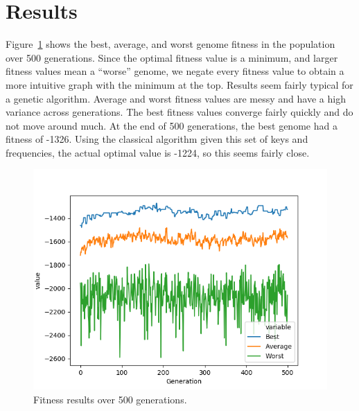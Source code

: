 
\section{Results}

Figure~\ref{fig:results} shows the best, average, and worst genome fitness in the population over 500 generations. Since the optimal fitness value is a minimum, and larger fitness values mean a ``worse'' genome, we negate every fitness value to obtain a more intuitive graph with the minimum at the top. Results seem fairly typical for a genetic algorithm. Average and worst fitness values are messy and have a high variance across generations. The best fitness values converge fairly quickly and do not move around much. At the end of 500 generations, the best genome had a fitness of -1326. Using the classical algorithm given this set of keys and frequencies, the actual optimal value is -1224, so this seems fairly close.

\begin{figure}[h]
    \centering
    \includegraphics[scale=0.75]{figures/results.png}
    \caption{ \small Fitness results over 500 generations.}
    \label{fig:results}
\end{figure}
